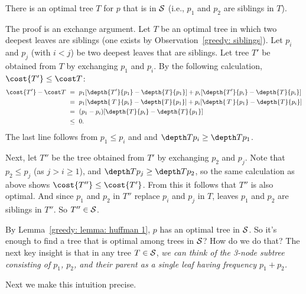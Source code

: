 \begin{lemma}\label{greedy: lemma: huffman 1}
  There is an optimal tree $T$ for $p$ that is in ${\cal S}$ (i.e., $p_1$ and $p_2$ are siblings in $T$).
\end{lemma}
\begin{shortFormProof}
  The proof is an exchange argument.
  Let $T$ be an optimal tree in which two deepest leaves are siblings
  (one exists by Observation~\ref{greedy: siblings}).  %
  Let $p_i$ and $p_j$ (with $i<j$) be two deepest leaves that are siblings.
  Let tree $T'$ be obtained from $T$ by exchanging $p_1$ and $p_i$.
  By the following calculation, $\cost{T'} \le \cost T$:
  \begin{align*}
    \cost {T'} - \cost T ~
    &= ~ p_1 [\depth {T'} {p_1} - \depth {T} {p_1}]
      + p_i [\depth {T'} {p_i} - \depth {T} {p_i}]
    \\
    &= ~ p_1 [\depth {\,T\,} {p_i} - \depth {T} {p_1}]
      + p_i [\depth {\,T\,} {p_1} - \depth {T} {p_i}] \\
    &= ~ (p_1-p_i) [\depth {T} {p_i} - \depth {T} {p_1}] \\
    &\le ~ 0.
  \end{align*}
  The last line follows from $p_1 \le p_i$ and 
  and $\depth T {p_i} \ge \depth T {p_1}$.

  Next, let $T''$ be the tree obtained from $T'$ by exchanging $p_2$ and $p_j$.
  Note that $p_2 \le p_j$ (as $j > i \ge 1$), and $\depth T {p_j} \ge \depth T {p_2}$,
  so the same calculation as above shows $\cost {T''} \le \cost{T'}$.
  From this it follows that $T''$ is also optimal.
  And since $p_1$ and $p_2$ in $T''$
  replace $p_i$ and $p_j$ in $T$,
  leaves $p_1$ and $p_2$ are siblings in $T''$.
  So $T''\in{\cal S}$.
\end{shortFormProof}

By Lemma~\ref{greedy: lemma: huffman 1}, $p$ has an optimal tree in ${\cal S}$.
So it's enough to find a tree that is optimal among trees in ${\cal S}$?
How do we do that?
The next key insight is that in any tree $T\in{\cal S}$,
\emph{we can think of the 3-node subtree consisting of $p_1$, $p_2$, and their parent
  as a single leaf having frequency $p_1 + p_2$.}

Next we make this intuition precise.

